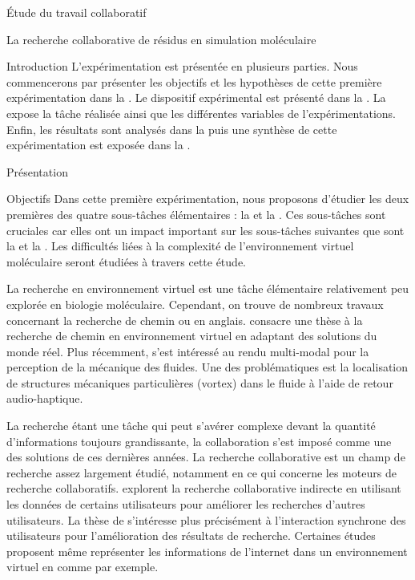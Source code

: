 \documentclass[myfrancais]{mythesis}
\begin{document}
\begin{mypart}{Étude du travail collaboratif}
\begin{mychapter}{La recherche collaborative de résidus en simulation moléculaire}
\begin{mysection}{Introduction}
				L'expérimentation est présentée en plusieurs parties.
				Nous commencerons par présenter les objectifs et les hypothèses de cette première expérimentation dans la .
				Le dispositif expérimental est présenté dans la .
				La  expose la tâche réalisée ainsi que les différentes variables de l'expérimentations.
				Enfin, les résultats sont analysés dans la  puis une synthèse de cette expérimentation est exposée dans la .
			\end{mysection}
			\begin{mysection}{Présentation}
				\begin{mysubsection}{Objectifs}
					Dans cette première expérimentation, nous proposons d'étudier les deux premières des quatre sous-tâches élémentaires : la  et la .
					Ces sous-tâches sont cruciales car elles ont un impact important sur les sous-tâches suivantes que sont la  et la .
					Les difficultés liées à la complexité de l'environnement virtuel moléculaire seront étudiées à travers cette étude.

					La recherche en environnement virtuel est une tâche élémentaire relativement peu explorée en biologie moléculaire.
					Cependant, on trouve de nombreux travaux concernant la \og recherche de chemin \fg ou  en anglais.
					 consacre une thèse à la recherche de chemin en environnement virtuel en adaptant des solutions du monde réel.
					Plus récemment,  s'est intéressé au rendu multi-modal pour la perception de la mécanique des fluides.
					Une des problématiques est la localisation de structures mécaniques particulières (vortex) dans le fluide à l'aide de retour audio-haptique.

					La recherche étant une tâche qui peut s'avérer complexe devant la quantité d'informations toujours grandissante, la collaboration s'est imposé comme une des solutions de ces dernières années.
					La recherche collaborative est un champ de recherche assez largement étudié, notamment en ce qui concerne les moteurs de recherche collaboratifs.
					 explorent la recherche collaborative indirecte en utilisant les données de certains utilisateurs pour améliorer les recherches d'autres utilisateurs.
					La thèse de  s'intéresse plus précisément à l'interaction synchrone des utilisateurs pour l'amélioration des résultats de recherche.
					Certaines études proposent même représenter les informations de l'internet dans un environnement virtuel en \myThreeD comme  par exemple.


\end{mysubsection}
\end{mysection}
\end{mychapter}
\end{mypart}
\end{document}

